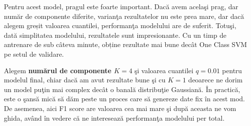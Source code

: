 Pentru acest model, pragul este foarte important. Dacă avem acelaşi prag,
dar număr de componente diferite, varianţa rezultatelor
nu este prea mare, dar dacă alegem greșit valoarea cuantilei, 
performanţa modelului are de suferit. Totuşi, 
dată simplitatea modelului, rezultatele sunt impresionante.
Cu un timp de antrenare de sub câteva minute, obține rezultate 
mai bune decât One Class SVM pe setul de validare.

Alegem \textbf{numărul de componente $K=4$} şi valoarea
cuantilei $q=0.01$ pentru modelul final, chiar dacă 
am avut rezultate bune şi cu $K=1$ deoarece ne dorim un model puţin mai complex 
decât o banală distribuţie Gaussiană. În practică, este o şansă mică să dăm peste 
un proces care să genereze date fix în acest mod. De asemenea, aici F1 score are valoarea cea mai mare
şi după aceasta ne vom ghida, având în vedere că ne interesează performanţa modelului 
per total.

